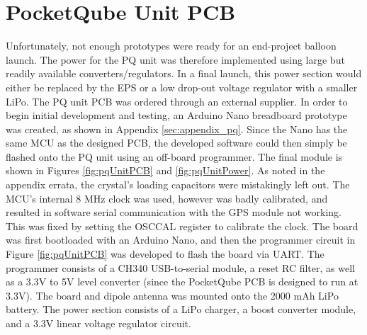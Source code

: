 \graphicspath{{./figures}}

\section{PocketQube Unit PCB}
Unfortunately, not enough prototypes were ready for an end-project balloon launch. The power for the PQ unit was therefore implemented using large but readily available converters/regulators. In a final launch, this power section would either be replaced by the EPS or a low drop-out voltage regulator with a smaller LiPo. The PQ unit PCB was ordered through an external supplier. In order to begin initial development and testing, an Arduino Nano breadboard prototype was created, as shown in Appendix \ref{sec:appendix_pq}. Since the Nano has the same MCU as the designed PCB, the developed software could then simply be flashed onto the PQ unit using an off-board programmer. The final module is shown in Figures \ref{fig:pqUnitPCB} and \ref{fig:pqUnitPower}. As noted in the appendix errata, the crystal's loading capacitors were mistakingly left out. The MCU's internal 8 MHz clock was used, however was badly calibrated, and resulted in software serial communication with the GPS module not working. This was fixed by setting the OSCCAL register to calibrate the clock. The board was first bootloaded with an Arduino Nano, and then the programmer circuit in Figure \ref{fig:pqUnitPCB} was developed to flash the board via UART. The programmer consists of a CH340 USB-to-serial module, a reset RC filter, as well as a 3.3V to 5V level converter (since the PocketQube PCB is designed to run at 3.3V). The board and dipole antenna was mounted onto the 2000 mAh LiPo battery. The power section consists of a LiPo charger, a boost converter module, and a 3.3V linear voltage regulator circuit.